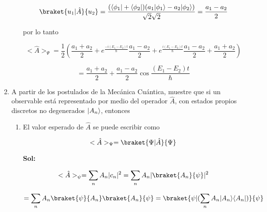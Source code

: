 \documentclass[12pt,a4paper]{article}
\DeclarePairedDelimiter\bra{\langle}{\rvert}
\DeclarePairedDelimiter\ket{\lvert}{\rangle}
\begin{document}
\begin{enumerate}
\begin{enumerate}
    \begin{equation*}
        \braket{u_1 | \hat{A}}{u_2} = \frac{(\bra{\phi_1} + \bra{\phi_2})(a_1\ket{\phi_1} - a_2 \ket{\phi_2})}{\sqrt{2}\sqrt{2}} = \frac{a_1 - a_2}{2} 
    \end{equation*}
    
    por lo tanto
    
    
    
    
    
    \begin{equation*}
      <\hat{A}>_{\Psi}  = \frac{1}{2}(\frac{a_1+a_2}{2} + e^{\frac{-i(E_1-E_2)t}{\hbar}}\frac{a_1 - a_2}{2} + e^{\frac{i(E_1 - E_2)t}{\hbar}}\frac{a_1 - a_2}{2} + \frac{a_1 + a_2}{2})
    \end{equation*}
    
    \begin{equation*}
        = \frac{a_1 +a_2}{2} + \frac{a_1 - a_2}{2} \cos{\frac{(E_1 - E_2)t}{\hbar}}
    \end{equation*}
    
    
    
\end{enumerate}






\item A partir de los postulados de la Mecánica Cuántica, muestre que si un observable está representado por medio del operador $\hat{A}$, con estados propios discretos no degenerados $\ket{A_n}$, entonces 

\begin{enumerate}
    \item El valor esperado de $\hat{A}$ se puede escribir como
    
    \begin{equation*}
        <\hat{A}>_{\Psi} = \braket{\Psi|\hat{A}}{\Psi}
    \end{equation*}
    
    \textbf{Sol:}
    
    \begin{equation*}
        <\hat{A}>_{\psi} = \sum_{n} A_n |c_n|^2 = \sum_{n} A_n |\braket{A_n}{\psi}|^2
    \end{equation*}
    
    \begin{equation*}
        = \sum_{n} A_n \braket{\psi}{A_n} \braket{A_n}{\psi} = \braket{\psi | (\sum_{n} A_n \ket{A_n} \bra{A_n})}{\psi}
    \end{equation*}
    

\end{enumerate}
\end{enumerate}
\end{document}
